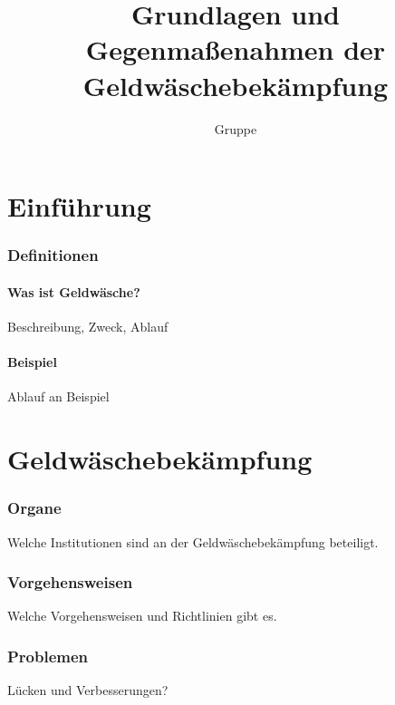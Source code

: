 \documentclass{article}
\begin{document}
\title{Grundlagen und Gegenmaßenahmen der Geldwäschebekämpfung}
\author{Gruppe}
\maketitle

\tableofcontents

\newpage

\part[Einführung]{Einführung}
    \section[Defintionen]{Definitionen}
        \subsection[Was ist Geldwäsche?]{Was ist Geldwäsche?}
            Beschreibung, Zweck, Ablauf
        \subsection[Beispiel]{Beispiel}
            Ablauf an Beispiel

\newpage

\part[Bekämpfung]{Geldwäschebekämpfung}
    \section[Organe]{Organe}
        Welche Institutionen sind an der Geldwäschebekämpfung beteiligt.
    \section[Vorgehensweise]{Vorgehensweisen}
        Welche Vorgehensweisen und Richtlinien gibt es. 
    \section[Probleme]{Problemen}
        Lücken und Verbesserungen?
\end{document}
